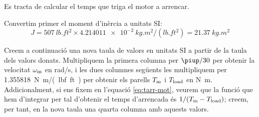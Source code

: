 \begin{exemple}
 Es tracta de calcular el temps que triga el motor a arrencar.

Convertim primer el moment d'inèrcia a unitats SI:
\[
    J =  \qty{507}{lb.ft^2} \times \qty{4,214011e-2}{kg.m^2/(lb.ft^2)}
    = \qty{21,37}{kg.m^2}
\]

Creem a continuació una nova taula de valors en unitats SI a partir de la taula dels valors donats. Multipliquem la primera columna per $\piup/30$ per obtenir la velocitat $\omega_\mathrm{m}$ en \unit{rad/s}, i les dues columnes següents les multipliquem per \qty{1,355818}{N.m/(lbf.ft)} per obtenir els parells $T_\mathrm{m}$ i $T_\mathrm{load}$ en \unit{N.m}. Addicionalment, si ens fixem en l'equació \eqref{eq:tarr-mot}, veurem que la funció que hem d'integrar per tal d'obtenir el temps d'arrencada és $1/(T_\mathrm{m}-T_\mathrm{load})$; creem, per tant, en la nova taula una quarta columna amb aquests valors.


\end{exemple}
